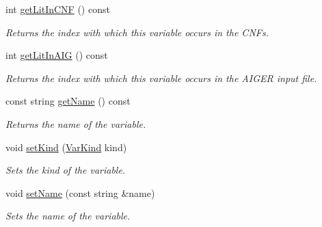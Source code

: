 \begin{DoxyCompactItemize}
int \hyperlink{classVarInfo_aefe8fc94158fe9e4d05c091176f14232}{get\-Lit\-In\-C\-N\-F} () const 
\begin{DoxyCompactList}\small\item\em Returns the index with which this variable occurs in the C\-N\-Fs. \end{DoxyCompactList}\item 
int \hyperlink{classVarInfo_ae3d28b77b1310b015c82774a08af4d94}{get\-Lit\-In\-A\-I\-G} () const 
\begin{DoxyCompactList}\small\item\em Returns the index with which this variable occurs in the A\-I\-G\-E\-R input file. \end{DoxyCompactList}\item 
const string \hyperlink{classVarInfo_a71df037bdccad6ab1c49236bd86ced44}{get\-Name} () const 
\begin{DoxyCompactList}\small\item\em Returns the name of the variable. \end{DoxyCompactList}\item 
void \hyperlink{classVarInfo_abe5617dbfaf5778b4f4d24c58177f950}{set\-Kind} (\hyperlink{classVarInfo_a64d1da76cf84fe674e5fef9764ef11cf}{Var\-Kind} kind)
\begin{DoxyCompactList}\small\item\em Sets the kind of the variable. \end{DoxyCompactList}\item 
void \hyperlink{classVarInfo_a8c34d435c8364a03a2002a01fa5424e6}{set\-Name} (const string \&name)
\begin{DoxyCompactList}\small\item\em Sets the name of the variable. \end{DoxyCompactList}\end{DoxyCompactItemize}
